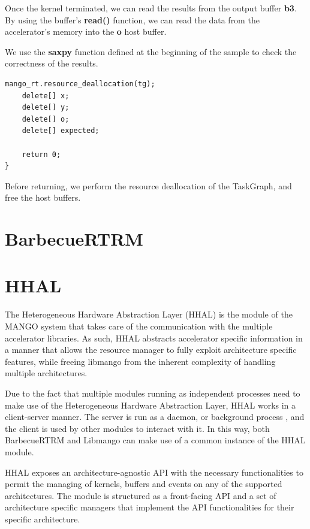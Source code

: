 Once the kernel terminated, we can read the results from the output buffer \textbf{b3}. By using the buffer's \textbf{read()} function, we can read the data from the accelerator's memory into the \textbf{o} host buffer.

We use the \textbf{saxpy} function defined at the beginning of the sample to check the correctness of the results.

\begin{lstlisting}[style=CStyle, caption=Sample - Teardown]
    mango_rt.resource_deallocation(tg);
    delete[] x;
    delete[] y;
    delete[] o;
    delete[] expected;

    return 0;
}
\end{lstlisting}

Before returning, we perform the resource deallocation of the TaskGraph, and free the host buffers.

\section{BarbecueRTRM}

\section{HHAL}


The Heterogeneous Hardware Abstraction Layer (HHAL) is the module of the MANGO system that takes care of the communication with the multiple accelerator libraries.
As such, HHAL abstracts accelerator specific information in a manner that allows the resource manager to fully exploit architecture specific features, while freeing libmango from the inherent complexity of handling multiple architectures.

Due to the fact that multiple modules running as independent processes need to make use of the Heterogeneous Hardware Abstraction Layer, HHAL works in a client-server manner. The server is run as a daemon, or background process \cite{daemon_wikipedia}, and the client is used by other modules to interact with it. In this way, both BarbecueRTRM and Libmango can make use of a common instance of the HHAL module.

HHAL exposes an architecture-agnostic API with the necessary functionalities to permit the managing of kernels, buffers and events on any of the supported architectures. The module is structured as a front-facing API and a set of architecture specific managers that implement the API functionalities for their specific architecture.

